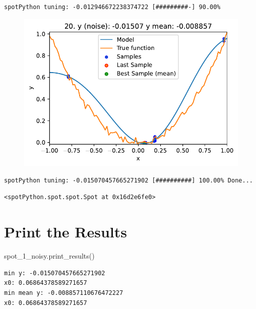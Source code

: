 \documentclass[
  letterpaper,
  DIV=11,
  numbers=noendperiod]{scrreprt}
\newenvironment{Shaded}{\begin{snugshade}}{\end{snugshade}}
\newcommand{\NormalTok}[1]{\textcolor[rgb]{0.00,0.23,0.31}{#1}}
\begin{document}
\begin{verbatim}
spotPython tuning: -0.012946672238374722 [#########-] 90.00% 
\end{verbatim}

\begin{figure}[H]

{\centering \includegraphics{08_spot_noisy_files/figure-pdf/cell-6-output-14.pdf}

}

\end{figure}

\begin{verbatim}
spotPython tuning: -0.015070457665271902 [##########] 100.00% Done...
\end{verbatim}

\begin{verbatim}
<spotPython.spot.spot.Spot at 0x16d2e6fe0>
\end{verbatim}

\hypertarget{print-the-results-3}{%
\section{Print the Results}\label{print-the-results-3}}

\begin{Shaded}
\begin{Highlighting}[]
\NormalTok{spot\_1\_noisy.print\_results()}
\end{Highlighting}
\end{Shaded}

\begin{verbatim}
min y: -0.015070457665271902
x0: 0.06864378589271657
min mean y: -0.008857110676472227
x0: 0.06864378589271657
\end{verbatim}
\end{document}
